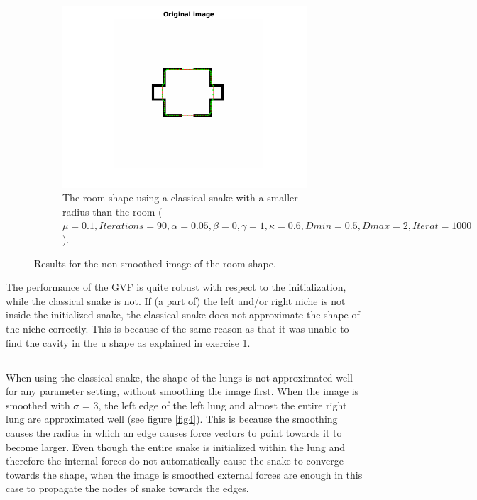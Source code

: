 \documentclass{article}
\begin{document}
\begin{figure}[h!]
\begin{subfigure}{0.49\textwidth}
  \centering
  \includegraphics[width=\linewidth]{fig3c.png}
  \caption{The room-shape using a classical snake with a smaller radius than the room ($\mu=0.1, Iterations=90, \alpha=0.05, \beta=0, \gamma=1,\kappa=0.6,Dmin=0.5,Dmax=2,Iterat=1000$).}
  \label{fig3c}
\end{subfigure}
\caption{Results for the non-smoothed image of the room-shape.}
\label{fig3}
\end{figure}

The performance of the GVF is quite robust with respect to the initialization, while the classical snake is not. If (a part of) the left and/or right niche is not inside the initialized snake, the classical snake does not approximate the shape of the niche correctly. This is because of the same reason as that it was unable to find the cavity in the u shape as explained in exercise 1.

\subsection{}
When using the classical snake, the shape of the lungs is not approximated well for any parameter setting, without smoothing the image first. When the image is smoothed with $\sigma$ = 3, the left edge of the left lung and almost the entire right lung are approximated well (see figure \ref{fig4}). This is because the smoothing causes the radius in which an edge causes force vectors to point towards it to become larger. Even though the entire snake is initialized within the lung and therefore the internal forces do not automatically cause the snake to converge towards the shape, when the image is smoothed external forces are enough in this case to propagate the nodes of snake towards the edges.
\end{document}
